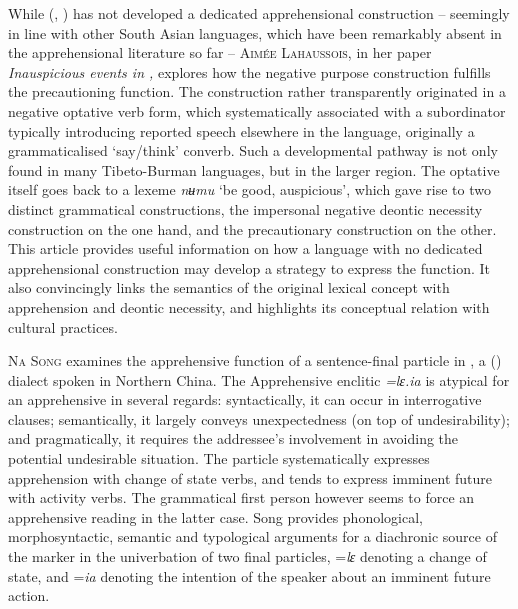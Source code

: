 \documentclass[output=paper,colorlinks,citecolor=brown]{langscibook}
\begin{document}
While \textsc{} (, ) has not developed a dedicated apprehensional construction – seemingly in line with other South Asian languages, which have been remarkably absent in the apprehensional literature so far – \textsc{Aimée} \textsc{Lahaussois}, in her paper \textit{Inauspicious events in ,} explores how the negative purpose construction fulfills the precautioning function. The construction rather transparently originated in a negative optative verb form, which systematically associated with a subordinator typically introducing reported speech elsewhere in the language, originally a grammaticalised `say/think' converb. Such a developmental pathway is not only found in many Tibeto-Burman languages, but in the larger region. The optative itself goes back to a lexeme \textit{nʉmu} {}`be good, auspicious', which gave rise to two distinct grammatical constructions, the impersonal negative deontic necessity construction on the one hand, and the precautionary construction on the other. This article provides useful information on how a language with no dedicated apprehensional construction may develop a strategy to express the function. It also convincingly links the semantics of the original lexical concept with apprehension and deontic necessity, and highlights its conceptual relation with  cultural practices.


\textsc{Na} \textsc{Song} examines the apprehensive function of a sentence-final particle in \textsc{}, a  () dialect spoken in Northern China. The Apprehensive enclitic \textit{=lɛ.ia} is atypical for an apprehensive in several regards: syntactically, it can occur in interrogative clauses; semantically, it largely conveys unexpectedness (on top of undesirability); and pragmatically, it requires the addressee's involvement in avoiding the potential undesirable situation. The particle systematically expresses apprehension with change of state verbs, and tends to express imminent future with activity verbs. The grammatical first person however seems to force an apprehensive reading in the latter case. Song provides phonological, morphosyntactic, semantic and typological arguments for a diachronic source of the marker in the univerbation of two final particles, =\textit{lɛ} denoting a change of state, and =\textit{ia} denoting the intention of the speaker about an imminent future action.
\end{document}
